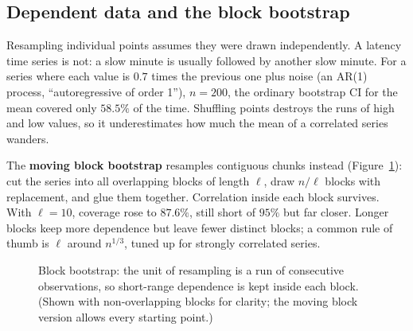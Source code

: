 \subsection{Dependent data and the block bootstrap}

Resampling individual points assumes they were drawn independently. A latency
time series is not: a slow minute is usually followed by another slow minute.
For a series where each value is $0.7$ times the previous one plus noise (an
AR(1) process, ``autoregressive of order 1''), $n = 200$, the ordinary
bootstrap CI for the mean covered only $58.5\%$ of the time. Shuffling points
destroys the runs of high and low values, so it underestimates how much the
mean of a correlated series wanders.

The \textbf{moving block bootstrap} resamples contiguous chunks instead
(Figure~\ref{fig:bootstrap-blocks}): cut the series into all overlapping blocks
of length $\ell$, draw $n/\ell$ blocks with replacement, and glue them
together. Correlation inside each block survives. With $\ell = 10$, coverage
rose to $87.6\%$, still short of $95\%$ but far closer. Longer blocks keep more
dependence but leave fewer distinct blocks; a common rule of thumb is $\ell$
around $n^{1/3}$, tuned up for strongly correlated series.

\begin{figure}[H]
\centering
{}
\caption{Block bootstrap: the unit of resampling is a run of consecutive
observations, so short-range dependence is kept inside each block. (Shown with
non-overlapping blocks for clarity; the moving block version allows every
starting point.)}
\label{fig:bootstrap-blocks}
\end{figure}

